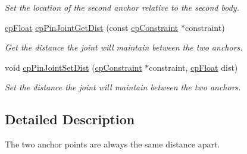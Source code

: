 \begin{DoxyCompactItemize}
\begin{DoxyCompactList}\small\item\em Set the location of the second anchor relative to the second body. \end{DoxyCompactList}\item 
\hypertarget{group__cp_pin_joint_ga8323ff5ff7b414a3e61885a0a0a77693}{}\hyperlink{group__basic_types_gac1ed65573e035bf892505768c852d8d3}{cp\+Float} \hyperlink{group__cp_pin_joint_ga8323ff5ff7b414a3e61885a0a0a77693}{cp\+Pin\+Joint\+Get\+Dist} (const \hyperlink{structcp_constraint}{cp\+Constraint} $\ast$constraint)\label{group__cp_pin_joint_ga8323ff5ff7b414a3e61885a0a0a77693}

\begin{DoxyCompactList}\small\item\em Get the distance the joint will maintain between the two anchors. \end{DoxyCompactList}\item 
\hypertarget{group__cp_pin_joint_ga460b8617cd1a3202fb94343b6a341a7e}{}void \hyperlink{group__cp_pin_joint_ga460b8617cd1a3202fb94343b6a341a7e}{cp\+Pin\+Joint\+Set\+Dist} (\hyperlink{structcp_constraint}{cp\+Constraint} $\ast$constraint, \hyperlink{group__basic_types_gac1ed65573e035bf892505768c852d8d3}{cp\+Float} dist)\label{group__cp_pin_joint_ga460b8617cd1a3202fb94343b6a341a7e}

\begin{DoxyCompactList}\small\item\em Set the distance the joint will maintain between the two anchors. \end{DoxyCompactList}\end{DoxyCompactItemize}


\subsection{Detailed Description}
The two anchor points are always the same distance apart. 

